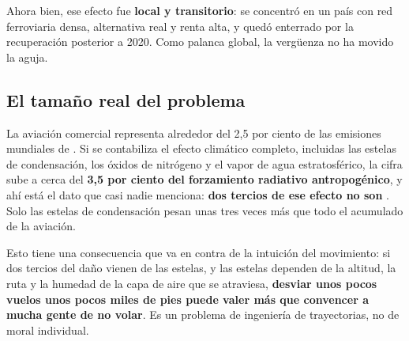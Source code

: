 \documentclass[11pt,letterpaper]{article}
\begin{document}
Ahora bien, ese efecto fue \textbf{local y transitorio}: se concentró en un
país con red ferroviaria densa, alternativa real y renta alta, y quedó
enterrado por la recuperación posterior a 2020. Como palanca global, la
vergüenza no ha movido la aguja.

\subsection*{El tamaño real del problema}

La aviación comercial representa alrededor del 2,5 por ciento de las emisiones
mundiales de  \parencite{owid2026aviacion}. Si se contabiliza el
efecto climático completo, incluidas las estelas de condensación, los óxidos de
nitrógeno y el vapor de agua estratosférico, la cifra sube a cerca del
\textbf{3,5 por ciento del forzamiento radiativo antropogénico}, y ahí está el
dato que casi nadie menciona: \textbf{dos tercios de ese efecto no son
} \parencite{lee2021}. Solo las estelas de condensación pesan unas tres
veces más que todo el  acumulado de la aviación.

Esto tiene una consecuencia que va en contra de la intuición del movimiento:
si dos tercios del daño vienen de las estelas, y las estelas dependen de la
altitud, la ruta y la humedad de la capa de aire que se atraviesa,
\textbf{desviar unos pocos vuelos unos pocos miles de pies puede valer más que
convencer a mucha gente de no volar}. Es un problema de ingeniería de
trayectorias, no de moral individual.
\end{document}

